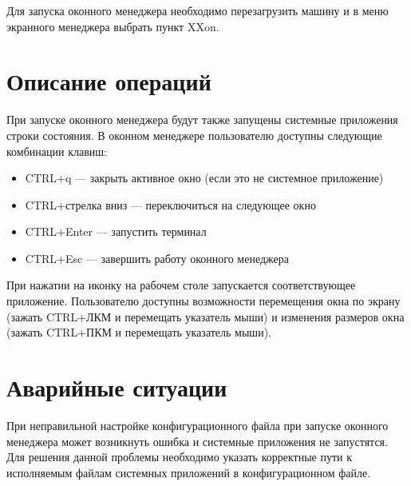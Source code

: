 \documentclass[10pt,a4paper]{report}
\begin{document}
Для запуска оконного менеджера необходимо перезагрузить машину и в меню экранного менеджера выбрать пункт XXon.
		
\section{Описание операций}
При запуске оконного менеджера будут также запущены системные приложения строки состояния. В оконном менеджере пользователю доступны следующие комбинации клавиш:
\begin{itemize}
\item CTRL+q --- закрыть активное окно (если это не системное приложение)
\item CTRL+стрелка вниз --- переключиться на следующее окно
\item CTRL+Enter --- запустить терминал
\item CTRL+Esc --- завершить работу оконного менеджера
\end{itemize}

При нажатии на иконку на рабочем столе запускается соответствующее приложение. Пользователю доступны возможности перемещения окна по экрану (зажать CTRL+ЛКМ и перемещать указатель мыши) и изменения размеров окна (зажать CTRL+ПКМ и перемещать указатель мыши).

\section{Аварийные ситуации}
При неправильной настройке конфигурационного файла при запуске оконного менеджера может возникнуть ошибка и системные приложения не запустятся. Для решения данной проблемы необходимо указать корректные пути к исполняемым файлам системных приложений в конфигурационном файле.
\end{document}

